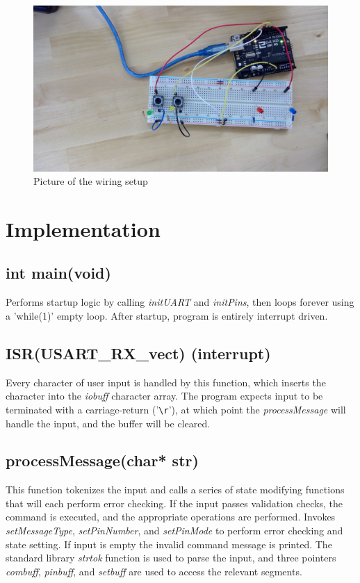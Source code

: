 \documentclass[letterpaper,11pt]{texMemo} %
\begin{document}
\begin{figure}[!ht]
\begin{center}
\includegraphics[width=\linewidth]{./configuration.jpg}
\caption{Picture of the wiring setup}
\end{center}
\end{figure}

\newpage
\section*{Implementation}

\subsection*{int main(void)}
Performs startup logic by calling \textit{initUART} and \textit{initPins}, then loops forever using a 'while(1)' empty loop. After startup, program is entirely interrupt driven. 

\subsection*{ISR(USART\_RX\_vect) (interrupt)}
Every character of user input is handled by this function, which inserts the character into the \textit{iobuff} character array. The program expects input to be terminated with a carriage-return ('\verb+\r+'), at which point the \textit{processMessage} will handle the input, and the buffer will be cleared.
\subsection*{processMessage(char* str)}
This function tokenizes the input and calls a series of state modifying functions that will each perform error checking. If the input passes validation checks, the command is executed, and the appropriate operations are performed.
Invokes \textit{setMessageType}, \textit{setPinNumber}, and \textit{setPinMode} to perform error checking and state setting. If input is empty the invalid command message is printed. The standard library \textit{strtok} function is used to parse the input, and three pointers \textit{combuff}, \textit{pinbuff}, and \textit{setbuff} are used to access the relevant segments.
\end{document}
